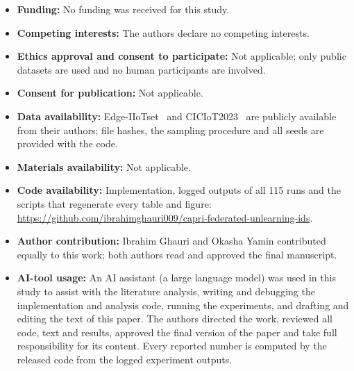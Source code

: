 \documentclass[pdflatex,sn-mathphys-num,iicol]{sn-jnl}
\begin{document}
\begin{itemize}
\item \textbf{Funding:} No funding was received for this study.
\item \textbf{Competing interests:} The authors declare no competing interests.
\item \textbf{Ethics approval and consent to participate:} Not applicable; only public datasets are used and no human participants are involved.
\item \textbf{Consent for publication:} Not applicable.
\item \textbf{Data availability:} Edge-IIoTset~\cite{ferrag2022} and CICIoT2023~\cite{neto2023} are publicly available from their authors; file hashes, the sampling procedure and all seeds are provided with the code.
\item \textbf{Materials availability:} Not applicable.
\item \textbf{Code availability:} Implementation, logged outputs of all 115 runs and the scripts that regenerate every table and figure: \url{https://github.com/ibrahimghauri009/capri-federated-unlearning-ids}.
\item \textbf{Author contribution:} Ibrahim Ghauri and Okasha Yamin contributed equally to this work; both authors read and approved the final manuscript.
\item \textbf{AI-tool usage:} An AI assistant (a large language model) was used in this study to assist with the literature analysis, writing and debugging the implementation and analysis code, running the experiments, and drafting and editing the text of this paper. The authors directed the work, reviewed all code, text and results, approved the final version of the paper and take full responsibility for its content. Every reported number is computed by the released code from the logged experiment outputs.
\end{itemize}


\end{document}
